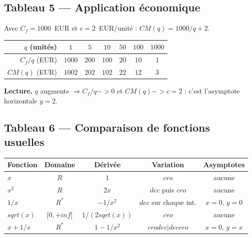 \documentclass[10pt,a4paper]{article}
\def\to{->}\def\mapsto{->}\def\infty{inf}\def\pm{+/-}%
\def\mathbb#1{#1}\def\lim{lim}\def\cup{U}\def\not{}%
\def\searrow{dec}\def\nearrow{cro}\def\cdot{*}\def\le{<=}\def\ge{>=}%
\def\sqrt#1{sqrt(#1)}\def\left{}\def\right{}%
\begin{document}
	\subsection*{Tableau 5 — Application \'economique}
	
	\noindent Avec $C_f=1000$~EUR et $c=2$~EUR/unit\'e : $CM(q)=1000/q+2$.
	
	\begin{center}\renewcommand{\arraystretch}{1.3}
		\begin{tabular}{|r|c|c|c|c|c|c|}
			\hline
			\rowcolor{blue!22}$q$ (unit\'es) & $1$ & $5$ & $10$ & $50$ & $100$ & $1000$\\
			\hline
			$C_f/q$ (EUR) & $1000$ & $200$ & $100$ & $20$ & $10$ & $1$\\
			\hline
			$CM(q)$ (EUR) & $1002$ & $202$ & $102$ & $22$ & $12$ & $3$\\
			\hline
		\end{tabular}
	\end{center}
	
	\noindent\textbf{Lecture.} $q$ augmente $\Rightarrow C_f/q\to 0$ et $CM(q)\to c=2$ : c'est l'asymptote horizontale $y=2$.
	
	\subsection*{Tableau 6 — Comparaison de fonctions usuelles}
	
	\begin{center}\renewcommand{\arraystretch}{1.3}
		\begin{tabular}{|l|c|c|c|c|}
			\hline
			\rowcolor{purple!22}\textbf{Fonction} & \textbf{Domaine} & \textbf{D\'eriv\'ee} & \textbf{Variation} & \textbf{Asymptotes}\\
			\hline
			$x$ & $\mathbb{R}$ & $1$ & $\nearrow$ & aucune\\
			\hline
			$x^{2}$ & $\mathbb{R}$ & $2x$ & $\searrow$ puis $\nearrow$ & aucune\\
			\hline
			$1/x$ & $\mathbb{R}^*$ & $-1/x^{2}$ & $\searrow$ sur chaque int. & $x=0$, $y=0$\\
			\hline
			$\sqrt{x}$ & $[0,+\infty[$ & $1/(2\sqrt{x})$ & $\nearrow$ & aucune\\
			\hline
			$x+1/x$ & $\mathbb{R}^*$ & $1-1/x^{2}$ & $\nearrow\searrow|\searrow\nearrow$ & $x=0$, $y=x$\\
			\hline
		\end{tabular}
	\end{center}
	
\end{document}
